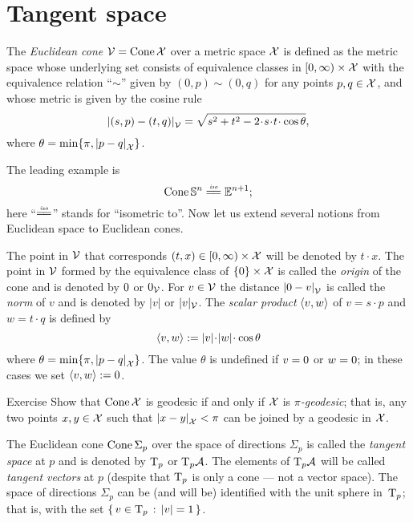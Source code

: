 \section{Tangent space}\label{sec: tangent space}

The \emph{Euclidean cone} $\mathcal{V}=\mathop{\rm Cone}\nolimits\mathcal{X}$
over a metric space $\mathcal{X}$
is defined as the metric space whose underlying set consists of
equivalence classes in
$[0,\infty)\times \mathcal{X}$ with the equivalence relation ``$\sim$'' given by $(0,p)\sim (0,q)$ for any points $p,q\in\mathcal{X}$,
and whose metric is given by the cosine rule
\[
\dist{(s,p)}{(t,q)}{\spc{V}} 
=
\sqrt{s^2+t^2-2\cdot s\cdot t\cdot \cos\theta},
\]
where $\theta= \min\{\pi, |{p}-{q}|_{\mathcal{X}}^{{}}\}$.

The leading example is
\[\Cone\SSS^n\iso\EE^{n+1};\]
here ``$\iso$'' stands for ``isometric to''. 
Now let us extend several notions from Euclidean space to Euclidean cones. 

The point in $\mathcal{V}$ that corresponds $(t,x)\in[0,\infty)\times \mathcal{X}$ will be denoted by $t\cdot x$.
The point in $\mathcal{V}$ formed by the equivalence class of $\{0\}\times\mathcal{X}$ is called the \emph{origin} of the cone and is denoted by $0$ or $0_{\mathcal{V}}$.
For $v\in\mathcal{V}$ the distance $|{0}-{v}|_{\mathcal{V}}^{{}}$ is called the \emph{norm} of $v$ and is denoted by $|v|$ or $|v|_{\mathcal{V}}$.
The \emph{scalar product} $\langle v,w\rangle$
of $v=s\cdot p$ and $w=t\cdot q$
is defined by 
\[\<v,w\>
\df |v|\cdot|w|\cdot\cos\theta
\]
where $\theta= \min\{\pi, |{p}-{q}|_{\mathcal{X}}^{{}}\}$.
The value $\theta$ is undefined if $v=0$ or $w=0$;
in these cases we set $\langle v,w\rangle\mathrel{:=}0$.

\begin{thm}{Exercise}\label{ex:geodesic-cone}
Show that $\mathop{\rm Cone}\nolimits\mathcal{X}$ is geodesic if and only if $\mathcal{X}$ is \emph{$\pi$-geodesic};
that is, any two points $x,y\in \mathcal{X}$ such that $|{x}-{y}|_{\mathcal{X}}^{{}}<\pi$ can be joined by a geodesic in $\mathcal{X}$.
\end{thm}

The Euclidean cone $\mathop{\rm Cone}\nolimits\Sigma_p$ over the space of directions $\Sigma_p$ is called the \emph{tangent space} at $p$ and is denoted by $\mathrm{T}_p$ or $\mathrm{T}_p\mathcal{A}$.
The elements of $\mathrm{T}_p\mathcal{A}$ will be called \emph{tangent vectors} at $p$
(despite that $\mathrm{T}_p$ is only a cone --- not a vector space).
The space of directions $\Sigma_p$ can be (and will be) identified with the unit sphere in~$\mathrm{T}_p$;
that is, with the set $\left\{\,{v\in\mathrm{T}_p}\,:\,{|v|=1}\,\right\}$.

